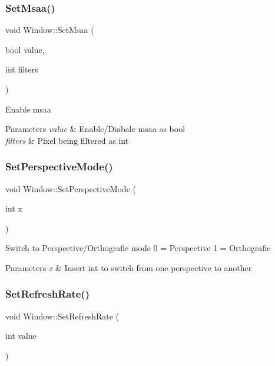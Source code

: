 \subsubsection{\texorpdfstring{SetMsaa()}{SetMsaa()}}
{\footnotesize\ttfamily void Window\+::\+Set\+Msaa (\begin{DoxyParamCaption}\item[{bool}]{value,  }\item[{int}]{filters }\end{DoxyParamCaption})}

Enable msaa 
\begin{DoxyParams}{Parameters}
{\em value} & Enable/\+Diabale msaa as bool \\
\hline
{\em filters} & Pixel being filtered as int \\
\hline
\end{DoxyParams}
\mbox{\label{class_window_ad4cc993a746593337163e9b998efb3e5}} 
\subsubsection{\texorpdfstring{SetPerspectiveMode()}{SetPerspectiveMode()}}
{\footnotesize\ttfamily void Window\+::\+Set\+Perspective\+Mode (\begin{DoxyParamCaption}\item[{int}]{x }\end{DoxyParamCaption})}

Switch to Perspective/\+Orthografic mode 0 = Perspective 1 = Orthografic 
\begin{DoxyParams}{Parameters}
{\em x} & Insert int to switch from one perspective to another \\
\hline
\end{DoxyParams}
\mbox{\label{class_window_aa3bb9982825282e226aa160d46278559}} 
\subsubsection{\texorpdfstring{SetRefreshRate()}{SetRefreshRate()}}
{\footnotesize\ttfamily void Window\+::\+Set\+Refresh\+Rate (\begin{DoxyParamCaption}\item[{int}]{value }\end{DoxyParamCaption})}

